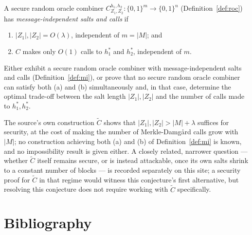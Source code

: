\documentclass{aicr-conjecture}
\newcommand{\Z}{Z}
\begin{document}
\begin{definition}\label{def:mi}
A secure random oracle combiner
$C^{h_{1},h_{2}}_{\Z_{1},\Z_{2}} : \{0,1\}^{m} \to \{0,1\}^{n}$
(Definition~\ref{def:roc}) has \emph{message-independent salts and
calls} if
\begin{enumerate}[nosep,label=(\alph*)]
  \item $|\Z_{1}|, |\Z_{2}| = O(\lambda)$, independent of $m = |M|$;
    and
  \item $C$ makes only $O(1)$ calls to $h_{1}^{*}$ and $h_{2}^{*}$,
    independent of $m$.
\end{enumerate}
\end{definition}

\begin{conjecture}\label{conj:main}
Either exhibit a secure random oracle combiner with message-independent
salts and calls (Definition~\ref{def:mi}), or prove that no secure
random oracle combiner can satisfy both (a) and (b) simultaneously and,
in that case, determine the optimal trade-off between the salt length
$|\Z_{1}|, |\Z_{2}|$ and the number of calls made to
$h_{1}^{*}, h_{2}^{*}$.
\end{conjecture}

\begin{remark}
The source's own construction $\widetilde C$ shows that
$|\Z_{1}|, |\Z_{2}| > |M| + \lambda$ suffices for security, at the cost
of making the number of Merkle-Damg\r{a}rd calls grow with $|M|$; no
construction achieving both (a) and (b) of Definition~\ref{def:mi} is
known, and no impossibility result is given either. A closely related,
narrower question --- whether $\widetilde C$ itself remains secure, or
is instead attackable, once its own salts shrink to a constant number
of blocks --- is recorded separately on this site; a security proof for
$\widetilde C$ in that regime would witness this conjecture's first
alternative, but resolving this conjecture does not require working
with $\widetilde C$ specifically.
\end{remark}

\section{Bibliography}
\end{document}
